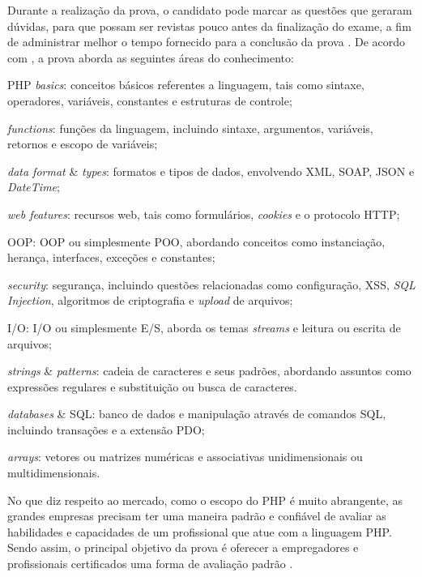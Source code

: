 Durante a realização da prova, o candidato pode marcar as questões
que geraram dúvidas, para que possam ser revistas pouco antes da finalização do
exame, a fim de administrar melhor o tempo fornecido para a conclusão da  prova
\cite{entrevistaAriZCEBrasil}. De acordo com , a 
prova aborda as seguintes áreas do conhecimento:

\begin{alineas}
    \item \acs{PHP} \textit{basics}: conceitos básicos referentes a
    linguagem, tais como sintaxe, operadores, variáveis, constantes e
    estruturas de controle;
    \item \textit{functions}: funções da linguagem, incluindo sintaxe,
    argumentos, variáveis, retornos e escopo de variáveis;
    \item \textit{data format} \& \textit{types}: formatos e tipos de
    dados, envolvendo \ac{XML}, \ac{SOAP}, \ac{JSON} e \textit{DateTime};
    \item \textit{web features}: recursos web, tais como formulários,
    \textit{cookies} e o protocolo \ac{HTTP};
    \item \acs{OOP}: \acl{OOP} ou simplesmente \ac{POO},
    abordando conceitos como instanciação, herança, interfaces, exceções e
    constantes;
    \item \textit{security}: segurança, incluindo questões relacionadas como
    configuração, \ac{XSS}, \textit{\acs{SQL} Injection},
    algoritmos de criptografia e \textit{upload} de arquivos;
    \item \acs{I/O}: \acl{I/O} ou simplesmente \ac{E/S}, aborda os
    temas \textit{streams} e leitura ou escrita de arquivos;
    \item \textit{strings} \& \textit{patterns}: cadeia de caracteres e
    seus padrões, abordando assuntos como expressões
    regulares e substituição ou busca de caracteres.
    \item \textit{databases} \& \acs{SQL}: banco de dados e
    manipulação através de comandos \ac{SQL}, incluindo transações e a
    extensão \ac{PDO};
    \item \textit{arrays}: vetores ou matrizes numéricas e
    associativas unidimensionais ou multidimensionais.
\end{alineas}

No que diz respeito ao mercado, como o escopo do \acs{PHP} é muito abrangente,
as grandes empresas precisam ter uma maneira padrão e confiável de avaliar as
habilidades e capacidades de um profissional que atue com a linguagem PHP.
Sendo assim, o principal objetivo da prova é oferecer a empregadores e profissionais
certificados uma forma de avaliação padrão \cite{zendPhp5CertificationStudyGuide}.

